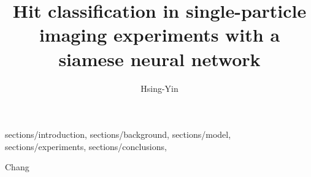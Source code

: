 
\usepackage{style}      %





{
    sections/introduction,
    sections/background,
    sections/model,
    sections/experiments,
    sections/conclusions,
}



    \title{Hit classification in single-particle imaging experiments with a siamese neural network}
    \author[a]{Hsing-Yin}{Chang}

    \maketitle

    
    

    
    
    

    
    


